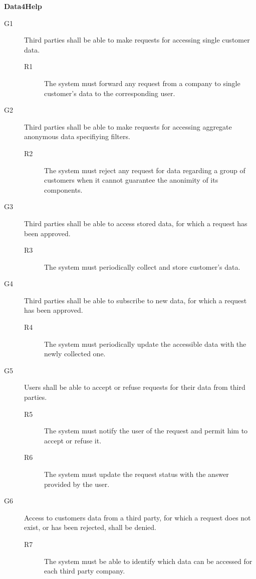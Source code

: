 \documentclass[../main.tex]{subfiles}
\begin{document}
\begin{minipage}{\textwidth}
\vspace{4mm}
{\bf Data4Help}
\begin{description}
	\item [G1]  Third parties shall be able to make requests for accessing single customer data.
	\begin{description}
		\item [R1] The system must forward any request from a company to single customer's data to the corresponding user.
	\end{description}

	\item [G2]  Third parties shall be able to make requests for accessing aggregate anonymous data specifiying filters.
	\begin{description}
		\item [R2] The system must reject any request for data regarding a group of customers when it cannot guarantee the anonimity of its components.
	\end{description}

	\item [G3]  Third parties shall be able to access stored data, for which a request has been approved.
	\begin{description}
		\item [R3] The system must periodically collect and store customer's data.
	\end{description}

	\item [G4]  Third parties shall be able to subscribe to new data, for which a request has been approved.
	\begin{description}
		\item [R4] The system must periodically update the accessible data with the newly collected one.
	\end{description}

	\item [G5]  Users shall be able to accept or refuse requests for their data from third parties.
	\begin{description}
		\item [R5] The system must notify the user of the request and permit him to accept or refuse it.
		\item [R6] The system must update the request status with the answer provided by the user.
	\end{description}

	\item [G6]  Access to customers data from a third party, for which a request does not exist, or has been rejected, shall be denied.
	\begin{description}
		\item [R7] The system must be able to identify which data can be accessed for each third party company.
	\end{description}
\end{description}
\end{minipage}
\vspace{8mm}
\end{document}
